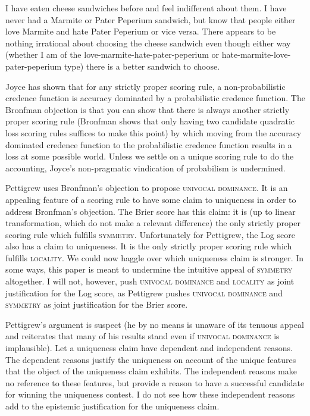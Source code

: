\documentclass[12pt]{article}
\begin{document}
I have eaten cheese sandwiches before and feel indifferent about them.
I have never had a Marmite or Pater Peperium sandwich, but know that
people either love Marmite and hate Pater Peperium or vice versa.
There appears to be nothing irrational about choosing the cheese
sandwich even though either way (whether I am of the
love-marmite-hate-pater-peperium or hate-marmite-love-pater-peperium
type) there is a better sandwich to choose. 

Joyce has shown that for any strictly proper scoring rule, a non-probabilistic
credence function is accuracy dominated by a probabilistic credence
function. The Bronfman objection is that you can show that there is
always another strictly proper scoring rule (Bronfman shows that only having
two candidate quadratic loss scoring rules suffices to make this
point) by which moving from the accuracy dominated credence function
to the probabilistic credence function results in a loss at some
possible world. Unless we settle on a unique scoring rule to do the
accounting, Joyce's non-pragmatic vindication of probabilism is
undermined. 

Pettigrew uses Bronfman's objection to propose \textsc{univocal
  dominance}. It is an appealing feature of a scoring rule to have
some claim to uniqueness in order to address Bronfman's objection. The
Brier score has this claim: it is (up to linear transformation, which
do not make a relevant difference) the only strictly proper scoring
rule which fulfills \textsc{symmetry}. Unfortunately for Pettigrew,
the Log score also has a claim to uniqueness. It is the only strictly
proper scoring rule which fulfills \textsc{locality}. We could now
haggle over which uniqueness claim is stronger. In some ways, this
paper is meant to undermine the intuitive appeal of \textsc{symmetry}
altogether. I will not, however, push \textsc{univocal dominance} and
\textsc{locality} as joint justification for the Log score, as
Pettigrew pushes \textsc{univocal dominance} and \textsc{symmetry} as
joint justification for the Brier score.

Pettigrew's argument is suspect (he by no means is unaware of its
tenuous appeal and reiterates that many of his results stand even if
\textsc{univocal dominance} is implausible). Let a uniqueness claim
have dependent and independent reasons. The dependent reasons justify
the uniqueness on account of the unique features that the object of
the uniqueness claim exhibits. The independent reasons make no
reference to these features, but provide a reason to have a successful
candidate for winning the uniqueness contest. I do not see how these
independent reasons add to the epistemic justification for the
uniqueness claim.
\end{document}
